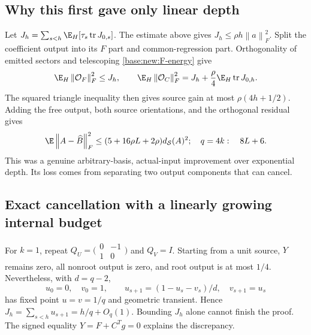 \documentclass[11pt,oneside,openany,a4paper]{book}
\numberwithin{equation}{chapter}
\theoremstyle{definition}
\theoremstyle{remark}
\newcommand{\F}[1]{\left\lVert#1\right\rVert_F}
\DeclareMathOperator{\tr}{tr}\DeclareMathOperator{\rank}{rank}
\begin{document}
\subsection{Why this first gave only linear depth}
Let $J_h=\sum_{s<h}\E_H[\tau_s\tr J_{0,s}]$. The estimate above gives $J_h\le\rho h\F a^2$. Split the coefficient output into its $F$ part and common-regression part. Orthogonality of emitted sectors and telescoping \eqref{base:new:F-energy} give
\[
 \E_H\F{\mathcal O_F}^2\le J_h,
 \qquad \E_H\F{\mathcal O_C}^2=J_h+\frac\rho4\E_H\tr J_{0,h}.
\]
The squared triangle inequality then gives source gain at most $\rho(4h+1/2)$. Adding the free output, both source orientations, and the orthogonal residual gives
\begin{equation}\label{base:new:linear}
 \E\F{A-\widehat B}^2\le(5+16\rho L+2\rho)d_{\mathcal S}(A)^2;
 \quad q=4k:\quad 8L+6.
\end{equation}
This was a genuine arbitrary-basis, actual-input improvement over exponential depth. Its loss comes from separating two output components that can cancel.

\subsection{Exact cancellation with a linearly growing internal budget}
For $k=1$, repeat $Q_U=\bigl(\begin{smallmatrix}0&-1\\1&0\end{smallmatrix}\bigr)$ and $Q_V=I$. Starting from a unit source, $Y$ remains zero, all nonroot output is zero, and root output is at most $1/4$. Nevertheless, with $d=q-2$,
\[
 u_0=0,\quad v_0=1,\qquad
 u_{s+1}=(1-u_s-v_s)/d,\quad v_{s+1}=u_s
\]
has fixed point $u=v=1/q$ and geometric transient. Hence $J_h=\sum_{s<h}u_{s+1}=h/q+O_q(1)$. Bounding $J_h$ alone cannot finish the proof. The signed equality $Y=F+C^Tg=0$ explains the discrepancy.
\end{document}
